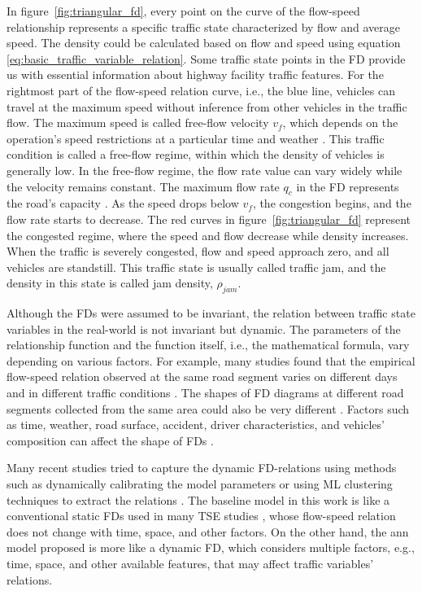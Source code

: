 \documentclass[english]{kththesis}
\begin{document}
In figure~\ref{fig:triangular_fd}, every point on the curve of the flow-speed relationship represents a specific traffic state characterized by flow and average speed. The density could be calculated based on flow and speed using equation \ref{eq:basic_traffic_variable_relation}. Some traffic state points in the FD provide us with essential information about highway facility traffic features. For the rightmost part of the flow-speed relation curve, i.e., the blue line, vehicles can travel at the maximum speed without inference from other vehicles in the traffic flow. The maximum speed is called free-flow velocity $v_f$, which depends on the operation's speed restrictions at a particular time and weather \cite{immers_traffic_theory_ku_leuven}. This traffic condition is called a free-flow regime, within which the density of vehicles is generally low. In the free-flow regime, the flow rate value can vary widely while the velocity remains constant. The maximum flow rate $q_c$ in the FD represents the road's capacity \cite{immers_traffic_theory_ku_leuven}. As the speed drops below $v_f$, the congestion begins, and the flow rate starts to decrease. The red curves in figure~\ref{fig:triangular_fd} represent the congested regime, where the speed and flow decrease while density increases. When the traffic is severely congested, flow and speed approach zero, and all vehicles are standstill. This traffic state is usually called traffic jam, and the density in this state is called jam density, $\rho_{jam}$.

Although the FDs were assumed to be invariant, the relation between traffic state variables in the real-world is not invariant but dynamic. The parameters of the relationship function and the function itself, i.e., the mathematical formula, vary depending on various factors. For example, many studies found that the empirical flow-speed relation observed at the same road segment varies on different days and in different traffic conditions \cite{neumann_bayesian, dervisoglu_auto-calibrate_fd, nguyen_online_calibration_fd_model}. The shapes of FD diagrams at different road segments collected from the same area could also be very different \cite{blandin_individual_speed}. Factors such as time, weather, road surface, accident, driver characteristics, and vehicles' composition can affect the shape of FDs \cite{seo_tse, Hoogendoorn_traffic_flow_theory_tu-delft}.

Many recent studies tried to capture the dynamic FD-relations using methods such as dynamically calibrating the model parameters or using ML clustering techniques to extract the relations \cite{neumann_bayesian, nguyen_online_calibration_fd_model, antoniou_ml_estimation}. The baseline model in this work is like a conventional static FDs used in many TSE studies \cite{anuar_flow_probe, blandin_individual_speed, neumann_static_fd_flow_estimation}, whose flow-speed relation does not change with time, space, and other factors. On the other hand, the \gls{ann} model proposed is more like a dynamic FD, which considers multiple factors, e.g., time, space, and other available features, that may affect traffic variables' relations.
\end{document}
